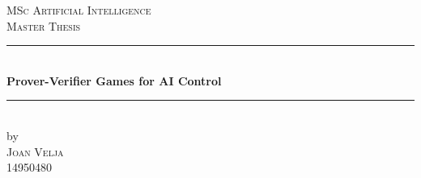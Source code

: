 \documentclass[12pt]{report}
\theoremstyle{definition}
\begin{document}
\dominitoc
\doparttoc
\begin{titlepage}




\newcommand{\HRule}{\rule{\linewidth}{0.5mm}} %

\center %







\textsc{\Large MSc Artificial Intelligence}\\[0.2cm]

\textsc{\Large Master Thesis}\\[0.5cm]








\HRule \\[0.4cm]

{ \huge \bfseries Prover-Verifier Games for AI Control}\\[0.1cm] %

\HRule \\[0.5cm]








by\\[0.2cm]

\textsc{\Large Joan Velja}\\[0.2cm] %

14950480\\[1cm]







\end{titlepage}
\end{document}
